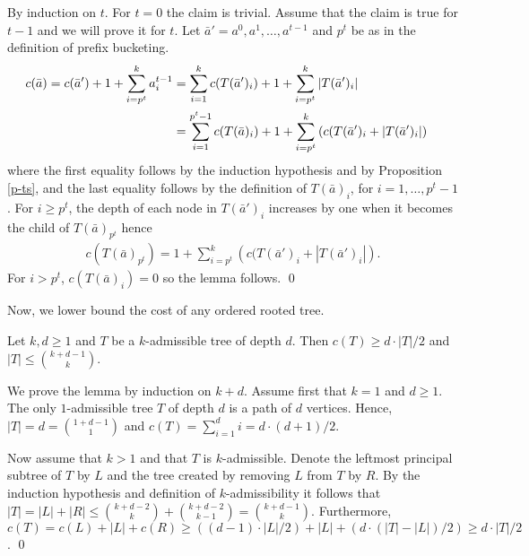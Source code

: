 \documentclass[runningheads,a4paper]{llncs}
\renewenvironment{proof}{\noindent{\it Proof. }} {{\qed}}
\begin{document}
\begin{proof}
By induction on $t$. For $t=0$ the claim is trivial. Assume that the claim is true for $t-1$ and we will prove it for $t$.
Let $\bar{a}'=a^0,a^1,\dots,a^{t-1}$ and $p^t$ be as in the definition of prefix bucketing.
\begin{align*}
c(\bar{a}) = c(\bar{a}') + 1 + \sum_{i=p^t}^k a^{t-1}_i 
&= \sum_{i=1}^k c(T(\bar{a}')_i) + 1 + \sum_{i=p^t}^k |T(\bar{a}')_i| \cr
&= \sum_{i=1}^{p^t-1} c(T(\bar{a})_i) + 1 + \sum_{i=p^t}^k \left(c(T(\bar{a}')_i + |T(\bar{a}')_i|\right) 
\end{align*}
where the first equality follows by the induction hypothesis and by Proposition \ref{p-ts}, and the last equality follows
by the definition of $T(\bar{a})_i$, for $i=1,\dots,p^t-1$.
For $i\ge p^t$, the depth of each node in $T(\bar{a}')_i$ increases by one when it becomes the child of $T(\bar{a})_{p^t}$ hence
\begin{align*}
c(T(\bar{a})_{p^t}) =  1 + \sum_{i=p^t}^k \left(c(T(\bar{a}')_i + |T(\bar{a}')_i|\right).
\end{align*}
For $i > p^t$, $c(T(\bar{a})_i) = 0$ so the lemma follows.
\end{proof}

Now, we lower bound the cost of any ordered rooted tree.

\begin{lemma}

\label{lm:k-d-complete}
Let $k,d \geq 1$ and $T$ be a $k$-admissible tree of depth $d$.
Then $c(T) \geq d \cdot |T| / 2$ and $|T| \leq \binom{k + d - 1}{k}$.
\end{lemma}
\begin{proof}
We prove the lemma by induction on $k + d$. Assume first that $k = 1$ and $d \geq 1$.
The only $1$-admissible tree $T$ of depth $d$ is a path of $d$ vertices. Hence,
$|T| = d = \binom{1 + d - 1}{1}$ and $c(T)=\sum_{i = 1}^d i  = d \cdot (d + 1) / 2$.

Now assume that $k > 1$ and that $T$ is $k$-admissible.
Denote the leftmost principal subtree of $T$ by $L$ and the tree created by removing $L$ from $T$ by $R$.
By the induction hypothesis and definition of $k$-admissibility it follows that $|T| = |L| + |R| \leq \binom{k + d - 2}{k} + \binom{k + d - 2}{k - 1} = \binom{k + d - 1}{k}$.
Furthermore, $c(T) = c(L) + |L| +  c(R) \geq ((d-1) \cdot |L|  / 2) + |L| + (d \cdot (|T| - |L|) / 2) \geq d \cdot |T| / 2$.
\end{proof}
\end{document}
